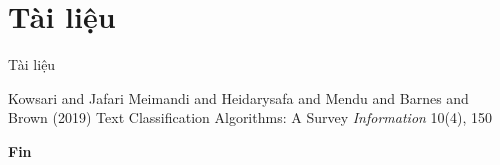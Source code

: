 \documentclass[aspectratio=169,xcolor=dvipsnames]{beamer}
\begin{document}







\section{Tài liệu}

\begin{frame}{Tài liệu}
    \footnotesize{
        \begin{thebibliography}{99}
             Kowsari and  Jafari Meimandi and  Heidarysafa and  Mendu and  Barnes and  Brown (2019)
            \newblock Text Classification Algorithms: A Survey
            \newblock \emph{Information} 10(4), 150
        \end{thebibliography}
    }
\end{frame}


\begin{frame}
    \Huge{\centerline{\textbf{Fin}}}
\end{frame}

\end{document}
